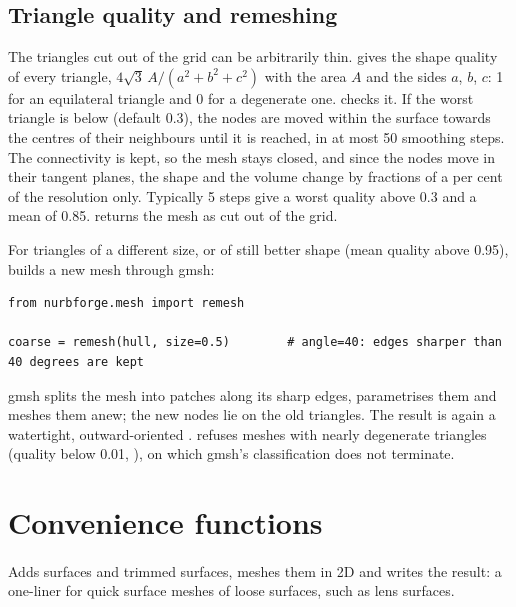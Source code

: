\subsection{Triangle quality and remeshing}

The triangles cut out of the grid can be arbitrarily thin. 
gives the shape quality of every triangle, $4\sqrt{3}\,A / (a^2 + b^2 + c^2)$ with the area $A$
and the sides $a$, $b$, $c$: 1 for an equilateral triangle and 0 for a degenerate one.
 checks it. If the worst triangle is below  (default 0.3),
the nodes are moved within the surface towards the centres of their neighbours until it is
reached, in at most 50 smoothing steps. The connectivity is kept, so the mesh stays closed, and
since the nodes move in their tangent planes, the shape and the volume change by fractions of a
per cent of the resolution only. Typically 5 steps give a worst quality above 0.3 and a mean of
0.85.  returns the mesh as cut out of the grid.

For triangles of a different size, or of still better shape (mean quality above 0.95),
 builds a new mesh through gmsh:

\begin{lstlisting}[style=python]
from nurbforge.mesh import remesh

coarse = remesh(hull, size=0.5)        # angle=40: edges sharper than 40 degrees are kept
\end{lstlisting}

gmsh splits the mesh into patches along its sharp edges, parametrises them and meshes them
anew; the new nodes lie on the old triangles. The result is again a watertight,
outward-oriented .  refuses meshes with nearly degenerate
triangles (quality below 0.01, ), on which gmsh's classification does not
terminate.

\section{Convenience functions}

\paragraph{} Adds
surfaces and trimmed surfaces, meshes them in 2D and writes the result: a one-liner for quick
surface meshes of loose surfaces, such as lens surfaces.

